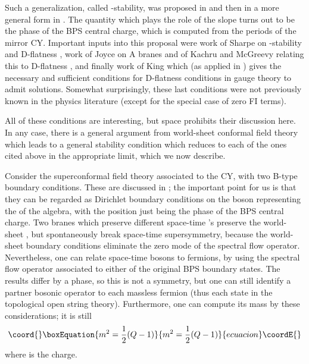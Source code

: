 \documentclass[a4paper,12pt]{amsart}
\numberwithin{equation}{section}
\theoremstyle{plain}
\theoremstyle{definition}
\def\cal{\mathcal}
\def\CN{{\cal N}}
\begin{document}
Such a generalization, called \myHighlight{$\Pi$}\coordHE{}-stability, was proposed in
\cite{DFR} and then in a more general form in \cite{DCS}.  The
quantity which plays the role of the slope turns out to be the phase
of the BPS central charge, which is computed from the periods \myHighlight{$\Pi$}\coordHE{} of
the mirror CY. Important inputs into this proposal were work of Sharpe
on \myHighlight{$\mu$}\coordHE{}-stability and D-flatness \cite{Sharpe}, work of Joyce on A
branes \cite{Joyce} and of Kachru and McGreevy relating this to
D-flatness \cite{KachruMac}, and finally work of King \cite{King}
which (as applied in \cite{DFR}) gives the necessary and sufficient
conditions for D-flatness conditions in \myHighlight{$\CN=1$}\coordHE{} gauge theory to admit
solutions. Somewhat surprisingly, these last conditions were not
previously known in the physics literature (except for the special
case of zero FI terms).

All of these conditions are interesting, but space prohibits their
discussion here.  In any case, there is a general argument from
world-sheet conformal field theory \cite{DCS} which leads to a general
stability condition which reduces to each of the ones cited above in
the appropriate limit, which we now describe.

Consider the \coordHE{} superconformal field theory associated to the CY,
with two B-type boundary conditions.  These are discussed in
\cite{OOY}; the important point for us is that they can be regarded as
Dirichlet boundary conditions on the boson representing the \coordHE{} of
the \coordHE{} algebra, with the position just being the phase of the BPS
central charge.  Two branes which preserve different space-time \myHighlight{$\CN=1$}\coordHE{}'s
preserve the world-sheet \myHighlight{$\CN=2$}\coordHE{}, but spontaneously break space-time
supersymmetry, because the world-sheet boundary conditions eliminate
the zero mode of the spectral flow operator.  Nevertheless,
one can relate space-time bosons to fermions, by using the spectral
flow operator associated to either of the original BPS boundary states.
The results differ by a phase, so this is not a symmetry, but
one can still identify a partner bosonic operator to each massless
fermion (thus each state in the topological open string theory).
Furthermore, one can compute its mass by these considerations; it is still
\begin{equation}\coord{}\boxEquation{ \label{eq:mass}
m^2 = \frac{1}{2} (Q-1)
}{ m^2 = \frac{1}{2} (Q-1)
}{ecuacion}\coordE{}\end{equation}
where \coordHE{} is the \coordHE{} charge.
\end{document}
